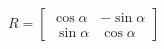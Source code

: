 \documentclass[10pt]{article}
\begin{document}
\begin{align*}R = \begin{bmatrix} \cos\alpha & - \sin\alpha \\\ \sin\alpha & \cos\alpha \end{bmatrix}\end{align*}
\end{document}
